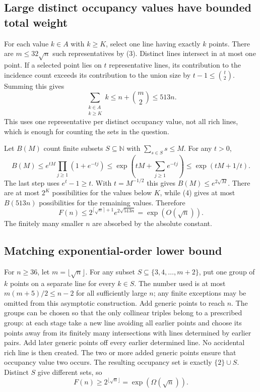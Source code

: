 \subsection*{Large distinct occupancy values have bounded total weight}
For each value $k\in A$ with $k\geq K$, select one line having exactly $k$ points. There are $m\leq32\sqrt n$ such representatives by (3). Distinct lines intersect in at most one point. If a selected point lies on $t$ representative lines, its contribution to the incidence count exceeds its contribution to the union size by $t-1\leq\binom t2$. Summing this gives
\[\sum_{\substack{k\in A\\k\geq K}}k
\leq n+\binom m2\leq513n.\tag{4}\]
This uses one representative per distinct occupancy value, not all rich lines, which is enough for counting the sets in the question.

Let $B(M)$ count finite subsets $S\subseteq\mathbb N$ with $\sum_{s\in S}s\leq M$. For any $t>0$,
\[
B(M)\leq e^{tM}\prod_{j\geq1}(1+e^{-tj})
\leq\exp\left(tM+\sum_{j\geq1}e^{-tj}\right)
\leq\exp(tM+1/t).
\]
The last step uses $e^t-1\geq t$. With $t=M^{-1/2}$ this gives $B(M)\leq e^{2\sqrt M}$. There are at most $2^K$ possibilities for the values below $K$, while (4) gives at most $B(513n)$ possibilities for the remaining values. Therefore
\[F(n)\leq2^{\lceil\sqrt n\rceil+1}e^{2\sqrt{513n}}
=\exp(O(\sqrt n)).
\]
The finitely many smaller $n$ are absorbed by the absolute constant.

\subsection*{Matching exponential-order lower bound}
For $n\geq36$, let $m=\lfloor\sqrt n\rfloor$. For any subset $S\subseteq\{3,4,\ldots,m+2\}$, put one group of $k$ points on a separate line for every $k\in S$. The number used is at most $m(m+5)/2\leq n-2$ for all sufficiently large $n$; any finite exceptions may be omitted from this asymptotic construction. Add generic points to reach $n$.
The groups can be chosen so that the only collinear triples belong to a prescribed group: at each stage take a new line avoiding all earlier points and choose its points away from its finitely many intersections with lines determined by earlier pairs. Add later generic points off every earlier determined line. No accidental rich line is then created. The two or more added generic points ensure that occupancy value two occurs. The resulting occupancy set is exactly $\{2\}\cup S$. Distinct $S$ give different sets, so
\[F(n)\geq2^{\lfloor\sqrt n\rfloor}=\exp(\Omega(\sqrt n)).
\]

